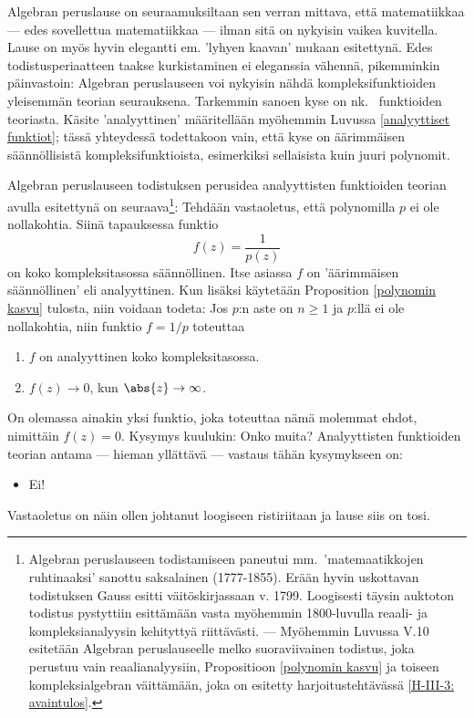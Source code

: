 Algebran peruslause on seuraamuksiltaan sen verran mittava, että matematiikkaa --- edes 
sovellettua matematiikkaa --- ilman sitä on nykyisin vaikea kuvitella. Lause on myös hyvin 
elegantti em. 'lyhyen kaavan' mukaan esitettynä. Edes todistusperiaatteen taakse kurkistaminen 
ei eleganssia vähennä, pikemminkin päinvastoin: Algebran peruslauseen voi nykyisin nähdä 
kompleksifunktioiden yleisemmän teorian seurauksena. Tarkemmin sanoen kyse on nk.\ 
 funktioiden teoriasta. Käsite 'analyyttinen' määritellään myöhemmin
Luvussa \ref{analyyttiset funktiot}; tässä yhteydessä todettakoon vain, että kyse on
äärimmäisen säännöllisistä kompleksifunktioista, esimerkiksi sellaisista kuin juuri polynomit.

Algebran peruslauseen todistuksen perusidea analyyttisten funktioiden teorian avulla
esitettynä on seuraava\footnote[2]{Algebran peruslauseen todistamiseen paneutui mm.\ 
'matemaatikkojen ruhtinaaksi' sanottu saksalainen  (1777-1855).
Erään hyvin uskottavan todistuksen Gauss esitti väitöskirjassaan v. 1799. Loogisesti täysin
auktoton todistus pystyttiin esittämään vasta myöhemmin 1800-luvulla reaali- ja
kompleksianalyysin kehityttyä riittävästi. --- Myöhemmin Luvussa V.10 esitetään Algebran
peruslauseelle melko suoraviivainen todistus, joka perustuu vain reaalianalyysiin, Propositioon
\ref{polynomin kasvu} ja toiseen kompleksialgebran väittämään, joka on esitetty
harjoitustehtävässä \ref{H-III-3: avaintulos}. \index{Gauss, C.F.|av}}: Tehdään vastaoletus,
että polynomilla $p$ ei ole nollakohtia. Siinä tapauksessa funktio
\[
f(z) = \frac{1}{p(z)}
\]
on koko kompleksitasossa säännöllinen. Itse asiassa $f$ on 'äärimmäisen säännöllinen' eli 
analyyttinen. Kun lisäksi käytetään Proposition \ref{polynomin kasvu} tulosta, niin voidaan 
todeta: Jos $p$:n aste on $n \ge 1$ ja $p$:llä ei ole nollakohtia, niin funktio $f=1/p$
toteuttaa
\begin{enumerate}
\item $f$ on analyyttinen koko kompleksitasossa.
\item $f(z) \rightarrow 0$, kun $\abs{z} \rightarrow \infty$.
\end{enumerate}
On olemassa ainakin yksi funktio, joka toteuttaa nämä molemmat ehdot, nimittäin $f(z) = 0$.
Kysymys kuulukin: Onko muita? Analyyttisten funktioiden teorian antama --- hieman yllättävä ---
vastaus tähän kysymykseen on:
\begin{itemize}
\item[] Ei!
\end{itemize}
Vastaoletus on näin ollen johtanut loogiseen ristiriitaan ja lause siis on tosi.

